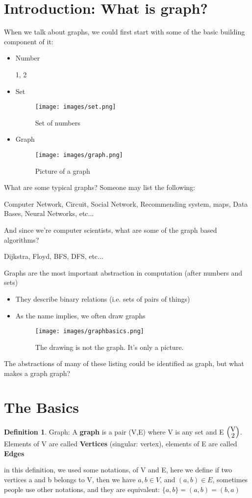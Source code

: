 \documentclass{article}
\theoremstyle{definition}
\newtheorem{definition}{Definition}
\theoremstyle{remark}
\begin{document}
\section{Introduction: What is graph?}
When we talk about graphs, we could first start with some of the basic building component of it:
\begin{itemize}
    \item Number
     \begin{center}
        1, 2
     \end{center}
    \item Set
     \begin{figure}[h]
     \centering
      \texttt{[image: images/set.png]}
      \caption{Set of numbers}
      \label{fig:set}
     \end{figure}
    \item Graph
     \begin{figure}[h]
     \centering
      \texttt{[image: images/graph.png]}
      \caption{Picture of a graph}
      \label{fig:graph}
     \end{figure}
\end{itemize}
What are some typical graphs? Someone may list the following:\par
Computer Network, Circuit, Social Network, Recommending system, maps, Data Bases, Neural Networks, etc...\par
And since we're computer scientists, what are some of the graph based algorithms?\par
Dijkstra, Floyd, BFS, DFS, etc...\par
Graphs are the most important abstraction in computation (after numbers and sets)
\begin{itemize}
    \item They describe binary relations (i.e. sets of pairs of things)
    
    \item As the name implies, we often draw graphs
     \begin{figure}[h]
    \centering
    \texttt{[image: images/graphbasics.png]}
    \caption{The drawing is not the graph. It's only a picture.}
    \label{fig:picture}
    \end{figure}
\end{itemize}
The abstractions of many of these listing could be identified as graph, but what makes a graph graph? 

\section{The Basics}
\begin{definition}{Graph:}
A \textbf{graph} is a pair (V,E) where V is any set and E \subseteq $\left( \stackanchor{V}{2} \right)$. Elements of V are called \textbf{Vertices} (singular: vertex), elements of E are called \textbf{Edges}
\end{definition}
in this definition, we used some notations, of V and E, here we define if two vertices a and b belongs to V, then we have $a, b \in V$, and $(a, b) \in E$, sometimes people use other notations, and they are equivalent: $\{a, b\} = (a, b) = (b, a)$
\end{document}
